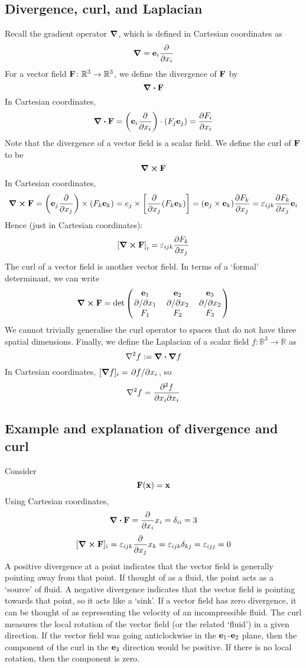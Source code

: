 \subsection{Divergence, curl, and Laplacian}
Recall the gradient operator \(\grad\), which is defined in Cartesian coordinates as
\[
	\grad = \vb e_i \frac{\partial}{\partial x_i}
\]
For a vector field \(\vb F \colon \mathbb R^3 \to \mathbb R^3\), we define the divergence of \(\vb F\) by
\[
	\div{\vb F}
\]
In Cartesian coordinates,
\[
	\div{\vb F} = \left( \vb e_i \frac{\partial}{\partial x_i} \right) \cdot (F_j \vb e_j) = \pdv{F_i}{x_i}
\]
Note that the divergence of a vector field is a scalar field.
We define the curl of \(\vb{F}\) to be
\[
	\curl{\vb F}
\]
In Cartesian coordinates,
\[
	\curl{\vb F} = \left( \vb e_j \pdv{x_j} \right) \times (F_k \vb e_k) = e_j \times \left[ \pdv{x_j}(F_k \vb e_k) \right] = (\vb e_j \times \vb e_k) \pdv{F_k}{x_j} = \varepsilon_{ijk} \pdv{F_k}{x_j}\vb e_i
\]
Hence (just in Cartesian coordinates):
\[
	\left[ \curl{\vb F} \right]_i = \varepsilon_{ijk} \pdv{F_k}{x_j}
\]
The curl of a vector field is another vector field.
In terms of a `formal' determinant, we can write
\[
	\curl{\vb F} = \det \begin{pmatrix}
		\vb e_1    & \vb e_2    & \vb e_3    \\
		\pdv*{x_1} & \pdv*{x_2} & \pdv*{x_2} \\
		F_1        & F_2        & F_3
	\end{pmatrix}
\]
We cannot trivially generalise the curl operator to spaces that do not have three spatial dimensions.
Finally, we define the Laplacian of a scalar field \(f \colon \mathbb R^3 \to \mathbb R\) as
\[
	\laplacian{f} := \div{\grad{f}}
\]
In Cartesian coordinates, \([\grad{f}]_i = \pdv*{f}{x_i}\), so
\[
	\laplacian{f} = \pdv{f}{x_i}{x_i}
\]

\subsection{Example and explanation of divergence and curl}
Consider
\[
	\vb F(\vb x) = \vb x
\]
Using Cartesian coordinates,
\[
	\div{\vb F} = \pdv{x_i}x_i = \delta_{ii} = 3
\]
\[
	[\curl{\vb F}]_i = \varepsilon_{ijk} \pdv{x_j} x_k = \varepsilon_{ijk} \delta_{kj} = \varepsilon_{ijj} = 0
\]
A positive divergence at a point indicates that the vector field is generally pointing away from that point.
If thought of as a fluid, the point acts as a `source' of fluid.
A negative divergence indicates that the vector field is pointing towards that point, so it acts like a `sink'.
If a vector field has zero divergence, it can be thought of as representing the velocity of an incompressible fluid.
The curl measures the local rotation of the vector field (or the related `fluid') in a given direction.
If the vector field was going anticlockwise in the \(\vb e_1\)-\(\vb e_2\) plane, then the component of the curl in the \(\vb e_3\) direction would be positive.
If there is no local rotation, then the component is zero.

